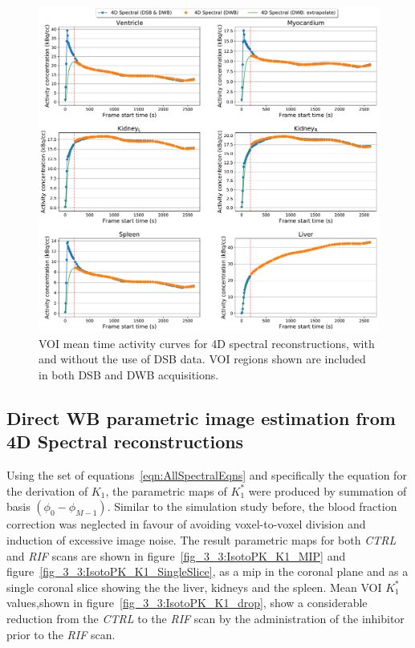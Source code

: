 \begin{figure} [h!]
\centering
\includegraphics[scale=0.5,angle=0]{3_Results/3_3_DWB_Reconstruction/figures/3_3_IsotoPK_CTRL_DWB_4D_vs_4D_central.pdf}
\caption{VOI mean time activity curves for 4D spectral reconstructions, with and without the use of DSB data. VOI regions shown are included in both DSB and DWB acquisitions.}
\label{fig_3_3:IsotoPK_CTRL_DWB_4D_vs_4D_Central}
\end{figure} 

\subsection{Direct WB parametric image estimation from 4D Spectral reconstructions}
Using the set of equations~\ref{eqn:AllSpectralEqns} and specifically the equation for the derivation of $K_1$, the parametric maps of $K_1^{*}$ were produced by summation of basis $(\phi_0-\phi_{M-1})$. Similar to the simulation study before, the blood fraction correction was neglected in favour of avoiding voxel-to-voxel division and induction of excessive image noise. The result parametric maps for both \textit{CTRL} and \textit{RIF} scans are shown in figure~\ref{fig_3_3:IsotoPK_K1_MIP} and figure~\ref{fig_3_3:IsotoPK_K1_SingleSlice}, as a \gls{mip} in the coronal plane and as a single coronal slice showing the the liver, kidneys and the spleen.
Mean VOI $K_1^{*}$ values,shown in figure~\ref{fig_3_3:IsotoPK_K1_drop}, show a considerable reduction from the \textit{CTRL} to the \textit{RIF} scan by the administration of the inhibitor prior to the \textit{RIF} scan. 

